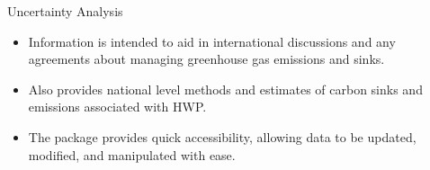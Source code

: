\documentclass[final]{beamer}\usepackage[]{graphicx}\usepackage[]{color}
\newlength{\sepwid}
\newlength{\onecolwid}
\newlength{\twocolwid}
\begin{document}
\begin{frame}[t]
\begin{columns}[t]
\begin{column}{\onecolwid}
\end{column} %

\begin{column}{\sepwid}\end{column} %

\begin{column}{\twocolwid} %

\begin{columns}[t,totalwidth=\twocolwid] %

\begin{column}{\onecolwid}\vspace{-.6in} %



\begin{block}{Uncertainty Analysis}
\begin{itemize}
\item Information is intended to aid in international discussions and any agreements about managing greenhouse gas emissions and sinks.
\item Also provides national level methods and estimates of carbon sinks and emissions associated with HWP.
\item The package provides quick accessibility, allowing data to be updated, modified, and manipulated with ease.
\end{itemize}
\end{block}




\end{column} %


\end{columns}
\end{column}
\end{columns}
\end{frame}
\end{document}
